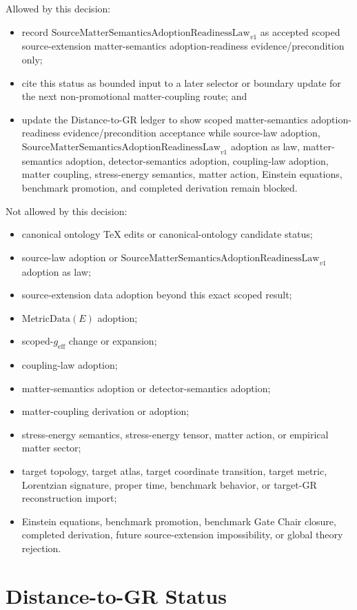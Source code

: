 \documentclass[11pt]{article}
\newcommand{\SMSAR}{\mathrm{SourceMatterSemanticsAdoptionReadinessLaw}_{v1}}
\newcommand{\MetricData}{\mathrm{MetricData}}
\newcommand{\geff}{g_{\mathrm{eff}}}
\begin{document}
Allowed by this decision:
\begin{itemize}[leftmargin=*]
  \item record \(\SMSAR\) as accepted scoped source-extension
  matter-semantics adoption-readiness evidence/precondition only;
  \item cite this status as bounded input to a later selector or boundary
  update for the next non-promotional matter-coupling route; and
  \item update the Distance-to-GR ledger to show scoped
  matter-semantics adoption-readiness evidence/precondition acceptance while
  source-law adoption, \(\SMSAR\) adoption as law, matter-semantics adoption,
  detector-semantics adoption, coupling-law adoption, matter coupling,
  stress-energy semantics, matter action, Einstein equations, benchmark
  promotion, and completed derivation remain blocked.
\end{itemize}

Not allowed by this decision:
\begin{itemize}[leftmargin=*]
  \item canonical ontology TeX edits or canonical-ontology candidate status;
  \item source-law adoption or \(\SMSAR\) adoption as law;
  \item source-extension data adoption beyond this exact scoped result;
  \item \(\MetricData(E)\) adoption;
  \item scoped-\(\geff\) change or expansion;
  \item coupling-law adoption;
  \item matter-semantics adoption or detector-semantics adoption;
  \item matter-coupling derivation or adoption;
  \item stress-energy semantics, stress-energy tensor, matter action, or
  empirical matter sector;
  \item target topology, target atlas, target coordinate transition, target
  metric, Lorentzian signature, proper time, benchmark behavior, or target-GR
  reconstruction import;
  \item Einstein equations, benchmark promotion, benchmark Gate Chair closure,
  completed derivation, future source-extension impossibility, or global
  theory rejection.
\end{itemize}

\section{Distance-to-GR Status}
\end{document}
